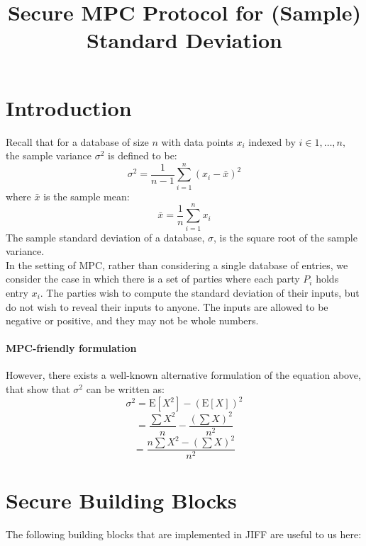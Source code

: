 \documentclass[11pt, oneside]{article}   	%
\title{Secure MPC Protocol for (Sample) Standard Deviation}
\begin{document}
\maketitle

\section{Introduction}
Recall that for a database of size $n$ with data points $x_i$ indexed by $i \in {1, \dots, n},$ the sample variance $\sigma^2$ is defined to be:
$$\sigma^2 = \frac{1}{n-1} \sum_{i=1}^n (x_i - \bar{x})^2$$
where $\bar{x}$ is the sample mean:
$$ \bar{x} = \frac{1}{n} \sum_{i=1}^n x_i$$ 
The sample standard deviation of a database, $\sigma$, is the square root of the sample variance. \\

In the setting of MPC, rather than considering a single database of entries, we consider the case in which there is a set of parties where each party $P_i$ holds entry $x_i$. The parties wish to compute the standard deviation of their inputs, but do not wish to reveal their inputs to anyone. The inputs are allowed to be negative or positive, and they may not be whole numbers.

\paragraph{MPC-friendly formulation} However, there exists a well-known alternative formulation of the equation above, that show that $\sigma^2$ can be written as:
$$ \sigma^2 = \text{E}[X^2] -(\text{E}[X])^2$$
$$ = \frac{\sum{X^2}}{n} - \frac{(\sum{X})^2}{n^2}$$
$$ = \frac{n\sum{X^2} - (\sum{X})^2}{n^2} $$

\section{Secure Building Blocks}
The following building blocks that are implemented in JIFF are useful to us here:
\end{document}
